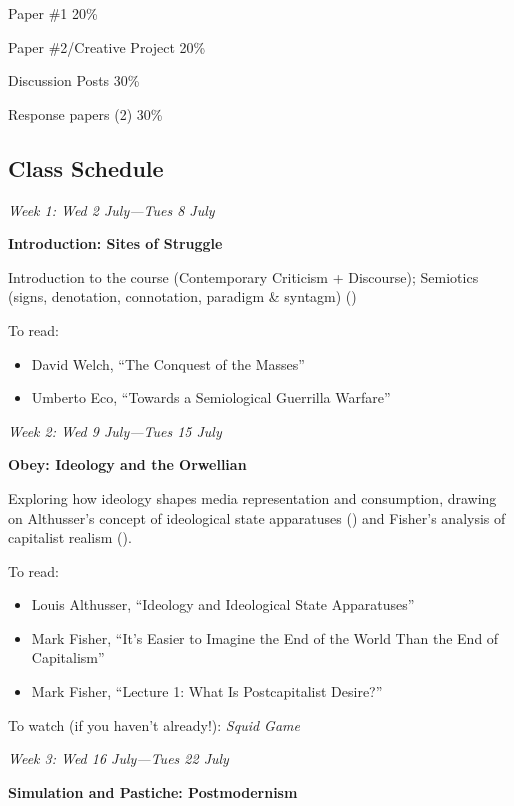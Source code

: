 \documentclass[
  letterpaper,
  DIV=11,
  numbers=noendperiod]{scrartcl}
\providecommand{\tightlist}{%
  \setlength{\itemsep}{0pt}\setlength{\parskip}{0pt}}
\begin{document}
Paper \#1 20\%

Paper \#2/Creative Project 20\%

Discussion Posts 30\%

Response papers (2) 30\%

\subsection{Class Schedule}\label{class-schedule}

\emph{Week 1: Wed 2 July---Tues 8 July}

\textbf{Introduction: Sites of Struggle}

Introduction to the course (Contemporary Criticism + Discourse);
Semiotics (signs, denotation, connotation, paradigm \& syntagm)
()

To read:

\begin{itemize}
\tightlist
\item
  David Welch, ``The Conquest of the Masses''
\item
  Umberto Eco, ``Towards a Semiological Guerrilla Warfare''
\end{itemize}

\emph{Week 2: Wed 9 July---Tues 15 July}

\textbf{Obey: Ideology and the Orwellian}

Exploring how ideology shapes media representation and consumption,
drawing on Althusser's concept of ideological state apparatuses
() and Fisher's
analysis of capitalist realism
().

To read:

\begin{itemize}
\tightlist
\item
  Louis Althusser, ``Ideology and Ideological State Apparatuses''
\item
  Mark Fisher, ``It's Easier to Imagine the End of the World Than the
  End of Capitalism''
\item
  Mark Fisher, ``Lecture 1: What Is Postcapitalist Desire?''
\end{itemize}

To watch (if you haven't already!): \emph{Squid Game}

\emph{Week 3: Wed 16 July---Tues 22 July}

\textbf{Simulation and Pastiche: Postmodernism}
\end{document}
